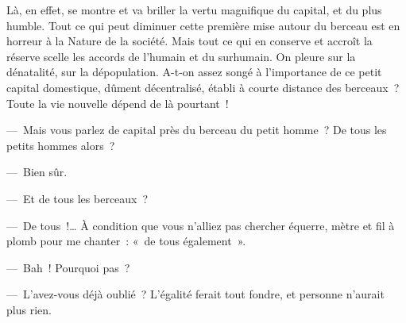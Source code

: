 \documentclass[french,twoside]{book} %
\begin{document}
Là, en effet, se montre et va briller la vertu magnifique du capital, et du plus humble. Tout ce qui peut diminuer cette première mise autour du berceau est en horreur à la Nature de la société. Mais tout ce qui en conserve et accroît la réserve scelle les accords de l’humain et du surhumain. On pleure sur la dénatalité, sur la dépopulation. A-t-on assez songé à l’importance de ce petit capital domestique, dûment décentralisé, établi à courte distance des berceaux ? Toute la vie nouvelle dépend de là pourtant !\par
— Mais vous parlez de capital près du berceau du petit homme ? De tous les petits hommes alors ?\par
— Bien sûr.\par
— Et de tous les berceaux ?\par
— De tous !… À condition que vous n’alliez pas chercher équerre, mètre et fil à plomb pour me chanter : « de tous également ».\par
— Bah ! Pourquoi pas ?\par
— L’avez-vous déjà oublié ? L’égalité ferait tout fondre, et personne n’aurait plus rien.
\end{document}
